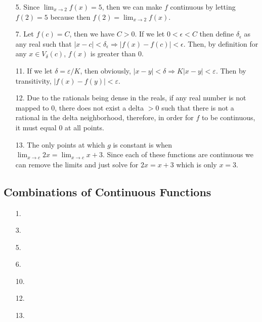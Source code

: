 \documentclass[letter paper, 11pt]{article}
\begin{document}
\begin{itemize}
\begin{itemize}
        
    \end{itemize}
    
    \item[5.] Since $\lim_{x\rightarrow 2}f(x) = 5$, then we can make $f$ continuous by letting $f(2)=5$ because then $f(2) = \lim_{x\rightarrow 2}f(x)$.
    
    \item[7.] Let $f(c) = C$, then we have $C > 0$. If we let $0<\epsilon<C$ then define $\delta_\epsilon$ as any real such that $|x-c|<\delta_\epsilon \Rightarrow |f(x)-f(c)|<\epsilon$. Then, by definition for any $x\in V_\delta(c)$, $f(x)$ is greater than $0$.
    
    \item[11.] If we let $\delta = \varepsilon/K$, then obviously, $|x-y|<\delta \Rightarrow K|x-y|<\varepsilon$. Then by transitivity, $|f(x)-f(y)|<\varepsilon$.
    
    \item[12.] Due to the rationals being dense in the reals, if any real number is not mapped to 0, there does not exist a delta $>0$ such that there is not a rational in the delta neighborhood, therefore, in order for $f$ to be continuous, it must equal 0 at all points.
    
    \item[13.] The only points at which $g$ is constant is when $\lim_{x\rightarrow c}2x=\lim_{x\rightarrow c}x+3$. Since each of these functions are continuous we can remove the limits and just solve for $2x=x+3$ which is only $x=3$. 
    

\end{itemize}

\subsection{Combinations of Continuous Functions}
\begin{itemize}
    \item[1.] 
    
    \item[3.]
    
    \item[5.]
    
    \item[6.]
    
    \item[10.]
    
    \item[12.]
    
    \item[13.]
    
\end{itemize}
\end{document}
